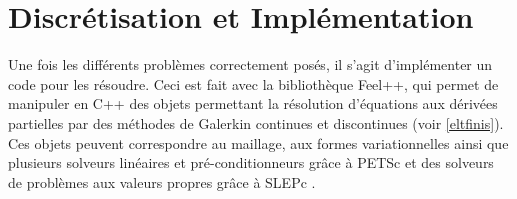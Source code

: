 \part{Discrétisation et Implémentation}
\label{partImp}

Une fois les différents problèmes correctement posés, il s'agit d'implémenter un code pour les résoudre. Ceci est fait avec la bibliothèque Feel++, qui permet de manipuler en C++ des objets permettant la résolution d'équations aux dérivées partielles par des méthodes de Galerkin continues et discontinues (voir \ref{eltfinis}). Ces objets peuvent correspondre au maillage, aux formes variationnelles ainsi que plusieurs solveurs linéaires et pré-conditionneurs grâce à PETSc \cite{petsc-web-page,petsc-user-ref,petsc-efficient} et des solveurs de problèmes aux valeurs propres grâce à SLEPc \cite{Hernandez:2005:SSF}.\\

